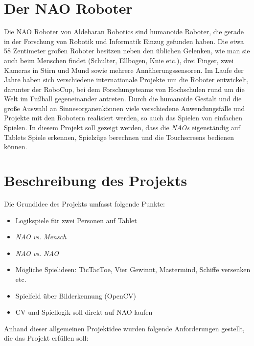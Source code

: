 \section{Der NAO Roboter}

Die NAO Roboter von Aldebaran Robotics sind humanoide Roboter, die gerade in der Forschung von Robotik und Informatik Einzug gefunden haben. Die etwa 58 Zentimeter großen Roboter besitzen neben den üblichen Gelenken, wie man sie auch beim Menschen findet (Schulter, Ellbogen, Knie etc.), drei Finger, zwei Kameras in Stirn und Mund sowie mehrere Annäherungssensoren. Im Laufe der Jahre haben sich verschiedene internationale Projekte um die Roboter entwickelt, darunter der RoboCup, bei dem Forschungsteams von Hochschulen rund um die Welt im Fußball gegeneinander antreten. Durch die humanoide Gestalt und die große Auswahl an \dq Sinnesorganen\dq können viele verschiedene Anwendungsfälle und Projekte mit den Robotern realisiert werden, so auch das Spielen von einfachen Spielen. In diesem Projekt soll gezeigt werden, dass die \textit{NAOs} eigenständig auf Tablets Spiele erkennen, Spielzüge berechnen und die Touchscreens bedienen können. 

\section{Beschreibung des Projekts}

Die Grundidee des Projekts umfasst folgende Punkte:

\begin{itemize}
    \item Logikspiele für zwei Personen auf Tablet
    \item \textit{NAO vs. Mensch}
    \item \textit{NAO vs. NAO}
    \item Mögliche Spielideen: TicTacToe, Vier Gewinnt, Mastermind, Schiffe versenken etc.
    \item Spielfeld über Bilderkennung (OpenCV)
    \item CV und Spiellogik soll direkt auf NAO laufen
\end{itemize}

Anhand dieser allgemeinen Projektidee wurden folgende Anforderungen gestellt, die das Projekt erfüllen soll:

